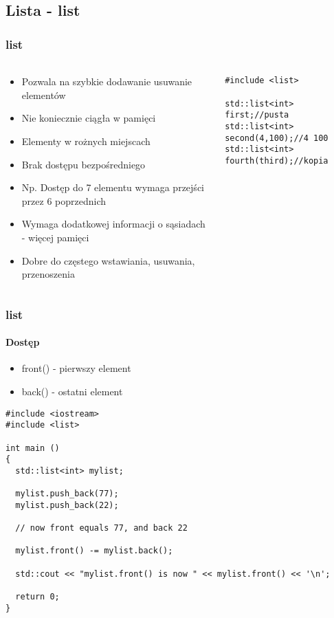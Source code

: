\documentclass[10pt]{beamer}
\begin{document}
\subsection{Lista - list}

\begin{frame}[fragile]
  \frametitle{list}
  \framesubtitle{}
  \begin{columns}
    \begin{column}{0.6\textwidth}
    \begin{itemize}
      \item Pozwala na szybkie dodawanie usuwanie elementów
      \item Nie koniecznie ciągła w pamięci
      \item Elementy w rożnych miejscach
      \item Brak dostępu bezpośredniego
      \item Np. Dostęp do 7 elementu wymaga przejści przez 6 poprzednich
      \item Wymaga dodatkowej informacji o sąsiadach - więcej pamięci
      \item Dobre do częstego wstawiania, usuwania, przenoszenia
    \end{itemize}
    \end{column}
    \begin{column}{0.47\textwidth}
\begin{lstlisting}
#include <list>

std::list<int> first;//pusta
std::list<int> second(4,100);//4 100
std::list<int> fourth(third);//kopia
\end{lstlisting}
    \end{column}
  \end{columns}
\end{frame}

\begin{frame}[fragile]
  \frametitle{list}
  \framesubtitle{Dostęp}
  \begin{itemize}
    \item front() - pierwszy element
    \item back() - ostatni element
  \end{itemize}
  \begin{lstlisting}
#include <iostream>
#include <list>

int main ()
{
  std::list<int> mylist;

  mylist.push_back(77);
  mylist.push_back(22);

  // now front equals 77, and back 22

  mylist.front() -= mylist.back();

  std::cout << "mylist.front() is now " << mylist.front() << '\n';

  return 0;
}
  \end{lstlisting}
\end{frame}
\end{document}
